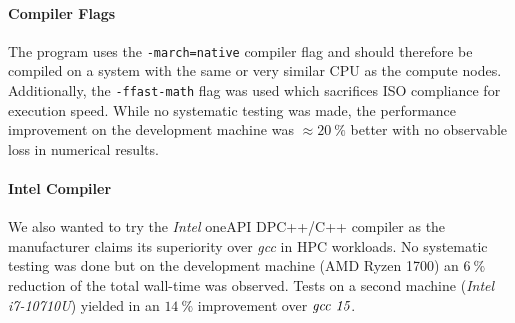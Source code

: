 	\paragraph{Compiler Flags}
		The program uses the \texttt{-march=native} compiler flag and should therefore be compiled on a system with the same or very similar CPU as the compute nodes. Additionally, the \texttt{-ffast-math} flag was used which sacrifices ISO compliance for execution speed. While no systematic testing was made, the performance improvement on the development machine was $\approx \SI{20}{\percent}$ better with no observable loss in numerical results. 
	
	\paragraph{Intel Compiler}
		We also wanted to try the \emph{Intel\textsuperscript{\tiny\textregistered}} oneAPI DPC++/C++ compiler as the manufacturer claims its superiority over \emph{gcc} in HPC workloads. No systematic testing was done but on the development machine (AMD Ryzen 1700) an $\SI{6}{\percent}$ reduction of the total wall-time was observed. Tests on a second machine (\emph{Intel\textsuperscript{\tiny\textregistered} i7-10710U}) yielded in an $\SI{14}{\percent}$ improvement over $\emph{gcc 15}$.
			
	


	